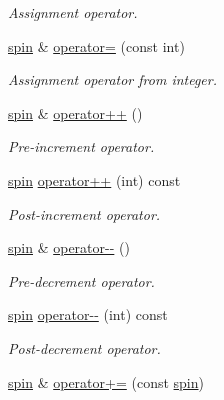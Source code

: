 \begin{DoxyCompactItemize}
\begin{DoxyCompactList}\small\item\em Assignment operator. \end{DoxyCompactList}\item 
\hypertarget{a00501_ab0bf38674fff23e6842f4e761de03111}{\hyperlink{a00501}{spin} \& \hyperlink{a00501_ab0bf38674fff23e6842f4e761de03111}{operator=} (const int)}\label{a00501_ab0bf38674fff23e6842f4e761de03111}

\begin{DoxyCompactList}\small\item\em Assignment operator from integer. \end{DoxyCompactList}\item 
\hypertarget{a00501_a45000110fac522fee51e3d67e8796c0e}{\hyperlink{a00501}{spin} \& \hyperlink{a00501_a45000110fac522fee51e3d67e8796c0e}{operator++} ()}\label{a00501_a45000110fac522fee51e3d67e8796c0e}

\begin{DoxyCompactList}\small\item\em Pre-\/increment operator. \end{DoxyCompactList}\item 
\hypertarget{a00501_a2ae3bc5eb4f2e0de2e6746cada283440}{\hyperlink{a00501}{spin} \hyperlink{a00501_a2ae3bc5eb4f2e0de2e6746cada283440}{operator++} (int) const }\label{a00501_a2ae3bc5eb4f2e0de2e6746cada283440}

\begin{DoxyCompactList}\small\item\em Post-\/increment operator. \end{DoxyCompactList}\item 
\hypertarget{a00501_a477c48621c45a7916c3df0255dff7d1b}{\hyperlink{a00501}{spin} \& \hyperlink{a00501_a477c48621c45a7916c3df0255dff7d1b}{operator-\/-\/} ()}\label{a00501_a477c48621c45a7916c3df0255dff7d1b}

\begin{DoxyCompactList}\small\item\em Pre-\/decrement operator. \end{DoxyCompactList}\item 
\hypertarget{a00501_a300d54fc68e6f4f435d9edaa5efb2e6e}{\hyperlink{a00501}{spin} \hyperlink{a00501_a300d54fc68e6f4f435d9edaa5efb2e6e}{operator-\/-\/} (int) const }\label{a00501_a300d54fc68e6f4f435d9edaa5efb2e6e}

\begin{DoxyCompactList}\small\item\em Post-\/decrement operator. \end{DoxyCompactList}\item 
\hypertarget{a00501_a432bbded01ee85e254f3bfb71498f617}{\hyperlink{a00501}{spin} \& \hyperlink{a00501_a432bbded01ee85e254f3bfb71498f617}{operator+=} (const \hyperlink{a00501}{spin})}\label{a00501_a432bbded01ee85e254f3bfb71498f617}


\end{DoxyCompactItemize}

